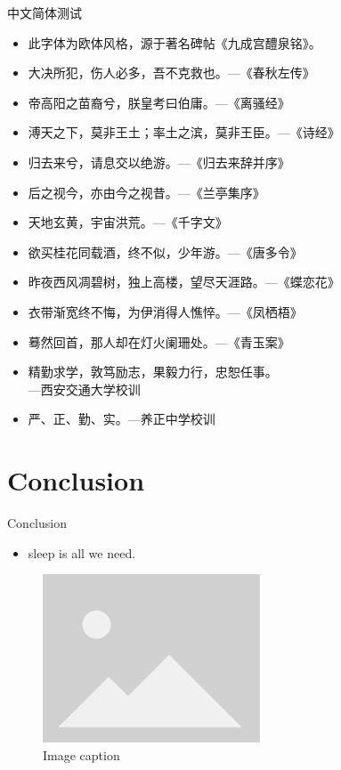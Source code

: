 \documentclass{beamer}
\newcommand{\oyxsc}{\CJKfamily{oyx-sc}}
\begin{document}
{
    \oyxsc
    \begin{frame}{\oyxsc 中文简体测试}
        \begin{itemize}
            \item 此字体为欧体风格，源于著名碑帖《九成宫醴泉铭》。
            \item 大决所犯，伤人必多，吾不克救也。---《春秋左传》
            \item 帝高阳之苗裔兮，朕皇考曰伯庸。---《离骚经》
            \item 溥天之下，莫非王土；率土之滨，莫非王臣。---《诗经》
            \item 归去来兮，请息交以绝游。---《归去来辞并序》
            \item 后之视今，亦由今之视昔。---《兰亭集序》
            \item 天地玄黄，宇宙洪荒。---《千字文》
            \item 欲买桂花同载酒，终不似，少年游。---《唐多令》
            \item 昨夜西风凋碧树，独上高楼，望尽天涯路。---《蝶恋花》
            \item 衣带渐宽终不悔，为伊消得人憔悴。---《凤栖梧》
            \item 蓦然回首，那人却在灯火阑珊处。---《青玉案》
            \item 精勤求学，敦笃励志，果毅力行，忠恕任事。\\---西安交通大学校训
            \item 严、正、勤、实。---养正中学校训
        \end{itemize}
    \end{frame}
}

\section{Conclusion}

\begin{frame}{Conclusion}
    \begin{itemize}
        \item sleep is all we need.
    \end{itemize}
    \begin{figure}
        \centering
        \includegraphics[height=5cm]{images/placeholder_image.png}
        \caption{Image caption}
        \label{fig:figure2}
    \end{figure}
\end{frame}
\end{document}
